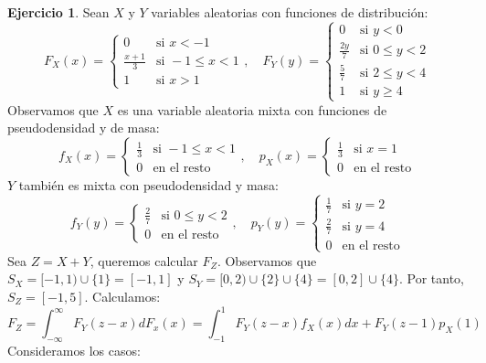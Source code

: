 \documentclass{report}
\theoremstyle{remark}
\theoremstyle{remark}
\theoremstyle{remark}
\theoremstyle{definition}
\theoremstyle{definition}
\theoremstyle{definition}
\theoremstyle{definition}
\newtheorem*{exercise}{Ejercicio}
\begin{document}
\begin{exercise}
    Sean $X$ y $Y$ variables aleatorias con funciones de distribución:
    $$F_X(x) = \begin{cases}
            0             & \text{si } x < -1        \\
            \frac{x+1}{3} & \text{si } -1 \leq x < 1 \\
            1             & \text{si } x > 1
        \end{cases}, \quad
        F_Y(y) = \begin{cases}
            0            & \text{si } y < 0        \\
            \frac{2y}{7} & \text{si } 0 \leq y < 2 \\
            \frac{5}{7}  & \text{si } 2 \leq y < 4 \\
            1            & \text{si } y \geq 4
        \end{cases}$$
    Observamos que $X$ es una variable aleatoria mixta con funciones de pseudodensidad y de masa:
    $$f_X(x) = \begin{cases}
            \frac{1}{3} & \text{si } -1 \leq x < 1 \\
            0           & \text{en el resto}
        \end{cases}, \quad
        p_X(x) = \begin{cases}
            \frac{1}{3} & \text{si } x = 1   \\
            0           & \text{en el resto}
        \end{cases}$$
    $Y$ también es mixta con pseudodensidad y masa:
    $$f_Y(y) = \begin{cases}
            \frac{2}{7} & \text{si } 0 \leq y < 2 \\
            0           & \text{en el resto}
        \end{cases}, \quad
        p_Y(y) = \begin{cases}
            \frac{1}{7} & \text{si } y = 2   \\
            \frac{2}{7} & \text{si } y = 4   \\
            0           & \text{en el resto}
        \end{cases}$$
    Sea $Z = X+Y$, queremos calcular $F_Z$.
    Observamos que $S_X = [-1,1) \cup \{1\} = [-1,1]$ y $S_Y = [0,2) \cup \{2\} \cup \{4\} = [0,2] \cup \{4\}$.
    Por tanto, $S_Z = [-1, 5]$.
    Calculamos:
    $$F_Z = \int_{-\infty}^\infty F_Y(z-x)dF_x(x) = \int_{-1}^1 F_Y(z-x)f_X(x)dx + F_Y(z-1)p_X(1)$$
    Consideramos los casos:

\end{exercise}
\end{document}
